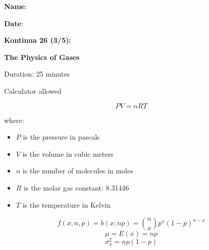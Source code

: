 \documentclass[letterpaper,12pt,addpoints]{exam}
\newcommand{\examnum}{Kontinua 26 (3/5)}
\newcommand{\content}{The Physics of Gases}
\begin{document}
\noindent \parbox{0.65\textwidth}{
\textbf{Name}:\ \hrulefill \\

\vspace{0.2cm}

\textbf{Date}:\ \hrulefill

\vspace{1.0cm}

\noindent \Large \textbf{\examnum :}

\Large \textbf{\content}

} 
\parbox{0.35\textwidth}{
\begin{flushright}\gradetable[v][questions]

\medskip

Duration: 25 minutes

Calculator allowed

\end{flushright}
}

\begin{mdframed}[frametitle={Ideal Gas Law}]

$$PV = nRT$$

where:
\begin{itemize}
\item[] $P$ is the pressure in pascals
\item[] $V$ is the volume in cubic meters
\item[] $n$ is the number of molecules in moles
\item[] $R$ is the molar gas constant: 8.31446
\item[] $T$ is the temperature in Kelvin
\end{itemize}
\end{mdframed}


\begin{mdframed}[style=important, frametitle={Binomial Distribution}]
$$f(x;n,p)=b(x;np)=\binom{n}{x}p^x(1-p)^{n-x}$$
$$\mu=E(x)=np$$
$$\sigma^2_x=np(1-p)$$
\end{mdframed}
\end{document}
